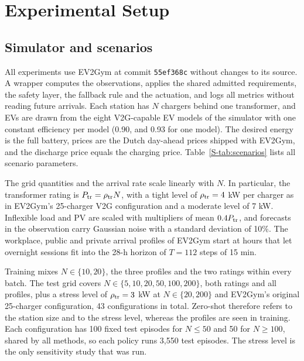 \section{Experimental Setup}\label{sec:setup}

\subsection{Simulator and scenarios}\label{sec:scenarios}

All experiments use EV2Gym \cite{orfanoudakis2025ev2gym} at commit \texttt{55ef368c} without changes to its source.
A wrapper computes the observations, applies the shared admitted requirements, the safety layer, the fallback rule and the actuation, and logs all metrics without reading future arrivals.
Each station has $N$ chargers behind one transformer, and EVs are drawn from the eight V2G-capable EV models of the simulator with one constant efficiency per model (0.90, and 0.93 for one model).
The desired energy is the full battery, prices are the Dutch day-ahead prices shipped with EV2Gym, and the discharge price equals the charging price.
Table~\ref{S-tab:scenarios} lists all scenario parameters.

The grid quantities and the arrival rate scale linearly with $N$.
In particular, the transformer rating is $P_{\mathrm{tr}}=\rho_{\mathrm{tr}}N$, with a tight level of $\rho_{\mathrm{tr}}=4$ kW per charger as in EV2Gym's 25-charger V2G configuration and a moderate level of 7 kW.
Inflexible load and PV are scaled with multipliers of mean $0.4P_{\mathrm{tr}}$, and forecasts in the observation carry Gaussian noise with a standard deviation of 10\%.
The workplace, public and private arrival profiles of EV2Gym start at hours that let overnight sessions fit into the 28-h horizon of $T=112$ steps of 15 min.

Training mixes $N\in\{10,20\}$, the three profiles and the two ratings within every batch.
The test grid covers $N\in\{5,10,20,50,100,200\}$, both ratings and all profiles, plus a stress level of $\rho_{\mathrm{tr}}=3$ kW at $N\in\{20,200\}$ and EV2Gym's original 25-charger configuration, 43 configurations in total.
Zero-shot therefore refers to the station size and to the stress level, whereas the profiles are seen in training.
Each configuration has 100 fixed test episodes for $N\le50$ and 50 for $N\ge100$, shared by all methods, so each policy runs 3,550 test episodes.
The stress level is the only sensitivity study that was run.


